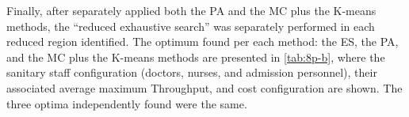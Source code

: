Finally, after separately applied both the PA and the MC plus the
K-means methods, the \textquotedblleft{}reduced exhaustive search\textquotedblright{}
was separately performed in each reduced region identified. The optimum
found per each method: the ES, the PA, and the MC plus the K-means
methods are presented in \ref{tab:8p-b}, where the sanitary staff
configuration (doctors, nurses, and admission personnel), their associated
average maximum Throughput, and cost configuration are shown. The
three optima independently found were the same.

